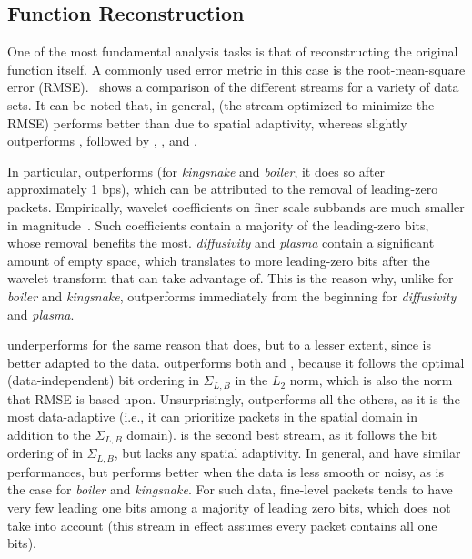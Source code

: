 \subsection{Function Reconstruction}\label{sec:rmse-optimized}

One of the most fundamental analysis tasks is that of reconstructing the original function itself. A
commonly used error metric in this case is the root-mean-square error
(RMSE).~ shows a comparison of the different streams for a variety of data
sets. It can be noted that, in general, \srop (the stream optimized to minimize the RMSE) performs
better than \srsg due to spatial adaptivity, whereas \srsg slightly outperforms \swav, followed by
\sbit, \smag, and \slvl.

In particular, \sbit outperforms \slvl (for \emph{kingsnake} and \emph{boiler}, it does so after
approximately 1 bps), which can be attributed to the removal of leading-zero packets. Empirically,
wavelet coefficients on finer scale subbands are much smaller in magnitude~\cite{spiht1996}. Such
coefficients contain a majority of the leading-zero bits, whose removal benefits \sbit the most.
\emph{diffusivity} and \emph{plasma} contain a significant amount of empty space, which translates
to more leading-zero bits after the wavelet transform that \sbit can take advantage of. This is the
reason why, unlike for \emph{boiler} and \emph{kingsnake}, \sbit outperforms \slvl immediately from
the beginning for \emph{diffusivity} and \emph{plasma}.

\smag underperforms for the same reason that \slvl does, but to a lesser extent, since \smag is
better adapted to the data. \swav outperforms both \slvl and \sbit, because it follows the optimal
(data-independent) bit ordering in $\Sigma_{L,B}$ in the $L_2$ norm, which is also the norm that
RMSE is based upon. Unsurprisingly, \srop outperforms all the others, as it is the most
data-adaptive (i.e., it can prioritize packets in the spatial domain in addition to the
$\Sigma_{L,B}$ domain). \srsg is the second best stream, as it follows the bit ordering of \srop in
$\Sigma_{L,B}$, but lacks any spatial adaptivity. In general, \swav and \ssig have similar
performances, but \ssig performs better when the data is less smooth or noisy, as is the case for
\emph{boiler} and \emph{kingsnake}. For such data, fine-level packets tends to have very few leading
one bits among a majority of leading zero bits, which \swav does not take into account (this stream
in effect assumes every packet contains all one bits).


